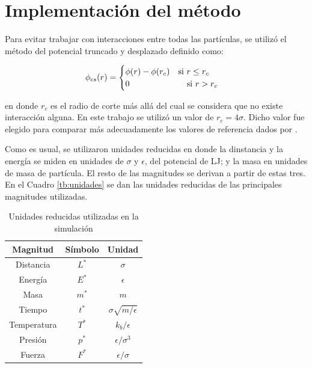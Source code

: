 \documentclass[a4paper,12pt]{article}
\begin{document}
\section{Implementación del método}

Para evitar trabajar con interacciones entre todas las partículas, se utilizó 
el método del potencial truncado y desplazado definido como:

\begin{equation}\label{eq:pot_cs}
  \phi_{cs}(r) = 
  \begin{cases}
	  \phi(r)- \phi(r_c) \quad \text{si } r \leq r_c \\
	  0 \hspace{2.4cm} \text{si } r > r_c
  \end{cases}
\end{equation}

\noindent en donde $r_c$ es el radio de corte más allá del cual se considera 
que no existe interacción alguna. En este trabajo se utilizó un valor de 
$r_c=4\sigma$. Dicho valor fue elegido para comparar más adecuadamente los 
valores de referencia dados por \cite{johnson1993}.

Como es usual, se utilizaron unidades reducidas en donde la dinstancia y la 
energía se miden en unidades de $\sigma$ y $\epsilon$, del potencial de LJ; y 
la masa en unidades de masa de partícula. El resto de las magnitudes se 
derivan a partir de estas tres. En el Cuadro \eqref{tb:unidades} se dan las 
unidades reducidas de las principales magnitudes utilizadas.

\begin{table}
	\begin{center}
		\begin{tabular}{ccc}
			\hline
			{\bf Magnitud} & {\bf Símbolo} & {\bf Unidad} \\ \hline
			Distancia   & $L^*$ & $\sigma$ \\ 
			Energía     & $E^*$ & $\epsilon$ \\ 
			Masa        & $m^*$ & $m$ \\ 
			Tiempo      & $t^*$ & $\sigma\sqrt{m/\epsilon}$ \\ 
			Temperatura & $T^*$ & $k_b/\epsilon$ \\ 
			Presión     & $p^*$ & $\epsilon/\sigma^3$ \\ 
			Fuerza      & $F^*$ & $\epsilon/\sigma$ \\ 
			\hline 
		\end{tabular}
	\end{center} 
	\caption{Unidades reducidas utilizadas en la simulación}
	\label{tb:unidades}
\end{table}
\end{document}
